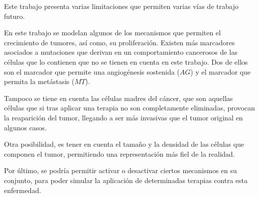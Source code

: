 Este trabajo presenta varias limitaciones que permiten
varias vías de trabajo futuro.

En este trabajo se modelan algunos de los mecanismos que permiten
el crecimiento de tumores, así como, su proliferación. Existen más
marcadores asociados a mutaciones que derivan en un comportamiento cancerosos
de las células que lo contienen que no se tienen en cuenta en este
trabajo. Dos de ellos son el marcador que permite una angiogénesis
sostenida ($AG$) y el marcador que permita la metástasis ($MT$).

Tampoco se tiene en cuenta las células madres del cáncer, que son
aquellas células que si tras aplicar una terapia no son completamente
eliminadas, provocan la reaparición del tumor, llegando a ser más
invasivas que el tumor original en algunos casos.

Otra posibilidad, es tener en cuenta el tamaño y la densidad
de las células que componen el tumor, permitiendo una representación
más fiel de la realidad.

Por último, se podría permitir activar o desactivar ciertos mecanismos
en su conjunto, para poder simular la aplicación de determinadas terapias contra
esta enfermedad.
